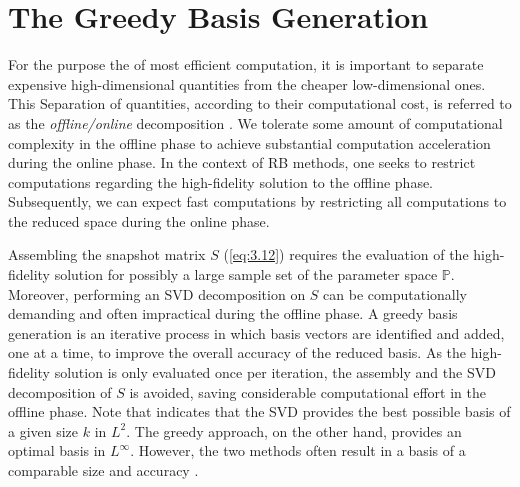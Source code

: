 \section{The Greedy Basis Generation} \label{sec:3.3} 
For the purpose the of most efficient computation, it is important to separate expensive high-dimensional quantities from the cheaper low-dimensional ones. This Separation of quantities, according to their computational cost, is referred to as the \emph{offline/online} decomposition \cite{quarteroni2015reduced}. We tolerate some amount of computational complexity in the offline phase to achieve substantial computation acceleration during the online phase. In the context of RB methods, one seeks to restrict computations regarding the high-fidelity solution to the offline phase. Subsequently, we can expect fast computations by restricting all computations to the reduced space during the online phase.

Assembling the snapshot matrix $S$ (\ref{eq:3.12}) requires the evaluation of the high-fidelity solution for possibly a large sample set of the parameter space $\mathbb P$. Moreover, performing an SVD decomposition on $S$ can be computationally demanding and often impractical during the offline phase. A greedy basis generation is an iterative process in which basis vectors are identified and added, one at a time, to improve the overall accuracy of the reduced basis. As the high-fidelity solution is only evaluated once per iteration, the assembly and the SVD decomposition of $S$ is avoided, saving considerable computational effort in the offline phase. Note that  indicates that the SVD provides the best possible basis of a given size $k$ in $L^2$. The greedy approach, on the other hand, provides an optimal basis in $L^{\infty}$. However, the two methods often result in a basis of a comparable size and accuracy \cite{quarteroni2015reduced}.

